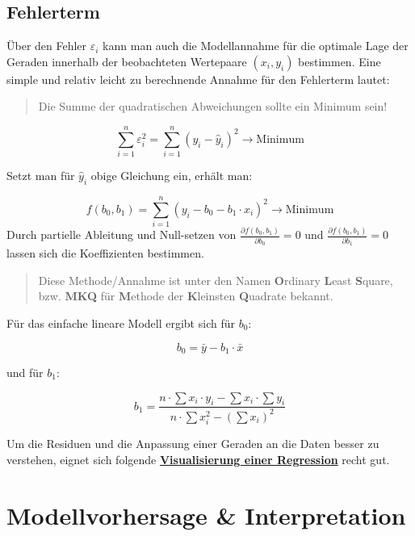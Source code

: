 \documentclass[
]{article}
\begin{document}
\subsection*{Fehlerterm}\label{fehlerterm}

Über den Fehler \(\varepsilon_i\) kann man auch die Modellannahme für die optimale Lage der Geraden innerhalb der beobachteten Wertepaare \((x_i, y_i)\) bestimmen. Eine simple und relativ leicht zu berechnende Annahme für den Fehlerterm lautet:

\begin{quote}
Die Summe der quadratischen Abweichungen sollte ein Minimum sein!
\end{quote}

\[\sum_{i=1}^{n} \varepsilon_{i}^2 = \sum_{i=1}^{n} (y_i - \hat{y}_i)^2 \rightarrow \text{Minimum}\]

Setzt man für \(\hat{y}_i\) obige Gleichung ein, erhält man:

\[f(b_0,b_1) = \sum_{i=1}^{n} (y_i - b_0 - b_1 \cdot x_i)^2 \rightarrow \text{Minimum}\]
Durch partielle Ableitung und Null-setzen von \(\frac{\partial f(b_0,b_1)}{\partial b_0} = 0\) und \(\frac{\partial f(b_0,b_1)}{\partial b_1} = 0\) lassen sich die Koeffizienten bestimmen.

\begin{quote}
Diese Methode/Annahme ist unter den Namen \textbf{O}rdinary \textbf{L}east \textbf{S}quare, bzw. \textbf{MKQ} für \textbf{M}ethode der \textbf{K}leinsten \textbf{Q}uadrate bekannt.
\end{quote}

Für das einfache lineare Modell ergibt sich für \(b_0\):

\[b_0 = \bar{y} - b_1 \cdot \bar{x}\]

und für \(b_1\):

\[b_1 = \frac{n \cdot \sum x_i \cdot y_i - \sum x_i \cdot \sum y_i}{n \cdot \sum x_i^2 - (\sum x_i)^2}\]

Um die Residuen und die Anpassung einer Geraden an die Daten besser zu verstehen, eignet sich folgende \href{newtab=https://phet.colorado.edu/sims/html/least-squares-regression/latest/least-squares-regression_en.html}{\textbf{Visualisierung einer Regression}} recht gut.

\section*{Modellvorhersage \& Interpretation}\label{modellvorhersage-interpretation}
\end{document}
